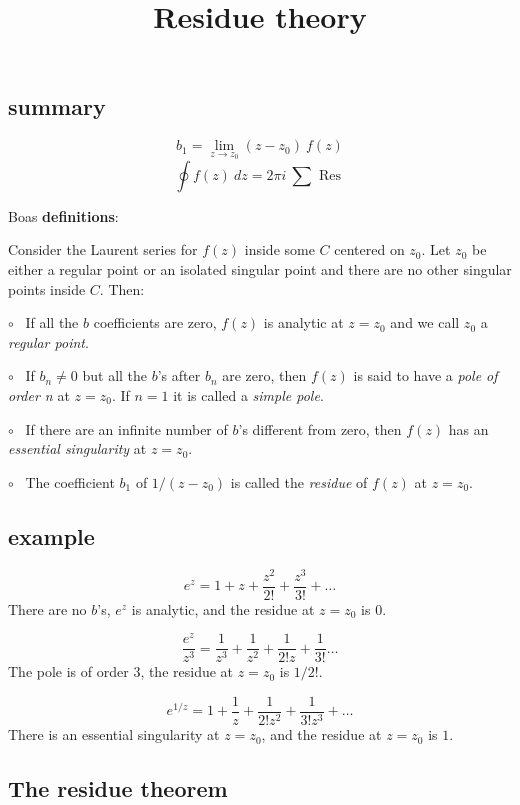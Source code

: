 \documentclass[11pt, oneside]{article}
\title{Residue theory}
\date{}
\begin{document}
\maketitle
\Large


\subsection*{summary}

\[ b_1 = \lim_{z \rightarrow z_0} (z-z_0) \ f(z)  \]
\[ \oint f(z) \ dz = 2 \pi i \ \sum \text{ Res } \]

Boas \textbf{definitions}:

Consider the Laurent series for $f(z)$ inside some $C$ centered on $z_0$.  Let $z_0$ be either a regular point or an isolated singular point and there are no other singular points inside $C$.  Then:

$\circ$ \ If all the $b$ coefficients are zero, $f(z)$ is analytic at $z = z_0$ and we call $z_0$ a \emph{regular point}.

$\circ$ \ If $b_n \ne 0$ but all the $b$'s after $b_n$ are zero, then $f(z)$ is said to have a \emph{pole of order n} at $z = z_0$.  If $n=1$ it is called a \emph{simple pole}.

$\circ$ \ If there are an infinite number of $b$'s different from zero, then $f(z)$ has an \emph{essential singularity} at $z = z_0$.

$\circ$ \ The coefficient $b_1$ of $1/(z - z_0)$ is called the \emph{residue} of $f(z)$ at $z = z_0$.

\subsection*{example}

\[ e^z = 1 + z + \frac{z^2}{2!} + \frac{z^3}{3!} + \dots \]
There are no $b$'s, $e^z$ is analytic, and the residue at $z = z_0$ is $0$.

\[ \frac{e^z}{z^3} = \frac{1}{z^3} + \frac{1}{z^2} + \frac{1}{2!z} + \frac{1}{3!} \dots \]
The pole is of order $3$, the residue at $z = z_0$ is $1/2!$.

\[ e^{1/z} = 1 + \frac{1}{z} + \frac{1}{2!z^2} + \frac{1}{3!z^3} + \dots \]
There is an essential singularity at $z = z_0$, and the residue at $z = z_0$ is $1$.

\subsection*{The residue theorem}
\end{document}
